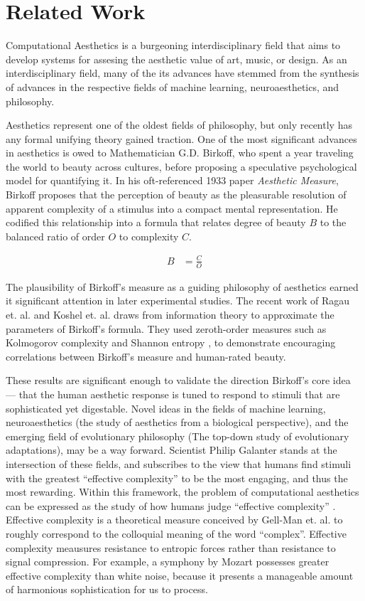 \documentclass[midd]{thesis}
\begin{document}
\chapter{Related Work}

Computational Aesthetics is a burgeoning interdisciplinary field that aims to develop systems for assesing the aesthetic value of art, music, or design. As an interdisciplinary field, many of the its advances have stemmed from the synthesis of advances in the respective fields of machine learning, neuroaesthetics, and philosophy.

Aesthetics represent one of the oldest fields of philosophy, but only recently has any formal unifying theory gained traction. One of the most significant advances in aesthetics is owed to Mathematician G.D. Birkoff, who spent a year traveling the world to beauty across cultures, before proposing a speculative psychological model for quantifying it. In his oft-referenced 1933 paper \emph{Aesthetic Measure}, Birkoff proposes that the perception of beauty as the pleasurable resolution of apparent complexity of a stimulus into a compact mental representation. He codified this relationship into a formula that relates degree of beauty $B$ to the balanced ratio of order $O$ to complexity $C$.

\begin{align*}
B &= \frac{C}{O}
\end{align*}

The plausibility of Birkoff's measure as a guiding philosophy of aesthetics earned it significant attention in later experimental studies. The recent work of Ragau et. al. and Koshel et. al. draws from information theory to approximate the parameters of Birkoff's formula. They used zeroth-order measures such as Kolmogorov complexity and Shannon entropy \cite{rigau-1, koshelev-1}, to demonstrate encouraging correlations between Birkoff's measure and human-rated beauty.

These results are significant enough to validate the direction Birkoff's core idea --- that the human aesthetic response is tuned to respond to stimuli that are sophisticated yet digestable. Novel ideas in the fields of machine learning, neuroaesthetics (the study of aesthetics from a biological perspective), and the emerging field of evolutionary philosophy (The top-down study of evolutionary adaptations), may be a way forward. Scientist Philip Galanter stands at the intersection of these fields, and subscribes to the view that humans find stimuli with the greatest ``effective complexity'' to be the most engaging, and thus the most rewarding. Within this framework, the problem of computational aesthetics can be expressed as the study of how humans judge ``effective complexity'' \cite{galanter-1,galanter-2,galanter-3,galanter-4}. Effective complexity is a theoretical measure conceived by Gell-Man et. al. \cite{gell2004effective} to roughly correspond to the colloquial meaning of the word ``complex''. Effective complexity meausures resistance to entropic forces rather than resistance to signal compression. For example, a symphony by Mozart possesses greater effective complexity than white noise, because it presents a manageable amount of harmonious sophistication for us to process.
\end{document}
